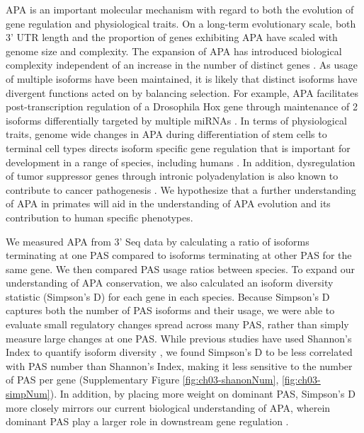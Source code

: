 APA is an important molecular mechanism with regard to both the evolution of gene regulation and physiological traits. On a long-term evolutionary scale, both 3' UTR length and the proportion of genes exhibiting APA have scaled with genome size and complexity. The expansion of APA has introduced biological complexity independent of an increase in the number of distinct genes \citep{mayr_evolution_2016,mayr_regulation_2017}. As usage of multiple isoforms have been maintained, it is likely that distinct isoforms have divergent functions acted on by balancing selection. For example, APA facilitates post-transcription regulation of a Drosophila Hox gene through maintenance of 2 isoforms differentially targeted by multiple miRNAs \citep{patraquim_evolution_2011}. In terms of physiological traits, genome wide changes in APA during differentiation of stem cells to terminal cell types directs isoform specific gene regulation that is important for development in a range of species, including humans \citep{hilgers_neural-specific_2011, ji_progressive_2009, li_dynamic_2012}. In addition, dysregulation of tumor suppressor genes through intronic polyadenylation is also known to contribute to cancer pathogenesis \citep{dubbury_cdk12_2018,lee_widespread_2018}. We hypothesize that a further understanding of APA in primates will aid in the understanding of APA evolution and its contribution to human specific phenotypes. 


We measured APA from 3' Seq data by calculating a ratio of isoforms terminating at one PAS compared to isoforms terminating at other PAS for the same gene. We then compared PAS usage ratios between species. To expand our understanding of APA conservation, we also calculated an isoform diversity statistic (Simpson's D) for each gene in each species. Because Simpson's D captures both the number of PAS isoforms and their usage, we were able to evaluate small regulatory changes spread across many PAS, rather than simply measure large changes at one PAS. While previous studies have used Shannon's Index to quantify isoform diversity \citep{pai_widespread_2016, wang_post-translational_2018}, we found Simpson's D to be less correlated with PAS number than Shannon's Index, making it less sensitive to the number of PAS per gene (Supplementary Figure \ref{fig:ch03-shanonNum}, \ref{fig:ch03-simpNum}). In addition, by placing more weight on dominant PAS, Simpson's D more closely mirrors our current biological understanding of APA, wherein dominant PAS play a larger role in downstream gene regulation \citep{morris_choosing_2014}.


